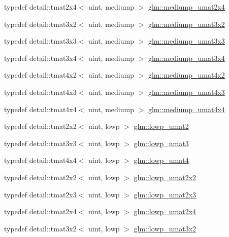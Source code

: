 \begin{CompactItemize}
\item 
typedef detail::tmat2x4$<$ uint, mediump $>$ \hyperlink{group__gtc__matrix__integer_gf79e9c80f024d31f3d66ddae75e90b6c}{glm::mediump\_\-umat2x4}
\item 
typedef detail::tmat3x2$<$ uint, mediump $>$ \hyperlink{group__gtc__matrix__integer_g65a9fdb1a5918fe6f308577065983e23}{glm::mediump\_\-umat3x2}
\item 
typedef detail::tmat3x3$<$ uint, mediump $>$ \hyperlink{group__gtc__matrix__integer_g31a05e7b2a6a596bdc7ceeb5d9c10e1c}{glm::mediump\_\-umat3x3}
\item 
typedef detail::tmat3x4$<$ uint, mediump $>$ \hyperlink{group__gtc__matrix__integer_g8113e067e1f327fac64cf9015c8c5431}{glm::mediump\_\-umat3x4}
\item 
typedef detail::tmat4x2$<$ uint, mediump $>$ \hyperlink{group__gtc__matrix__integer_g8ea45737e8bc9bfae2668968056b109f}{glm::mediump\_\-umat4x2}
\item 
typedef detail::tmat4x3$<$ uint, mediump $>$ \hyperlink{group__gtc__matrix__integer_gebe3b1b4b6030c096447e40fb00528f4}{glm::mediump\_\-umat4x3}
\item 
typedef detail::tmat4x4$<$ uint, mediump $>$ \hyperlink{group__gtc__matrix__integer_g24b1c76fefa58f810e24cafe0ea6a6a0}{glm::mediump\_\-umat4x4}
\item 
typedef detail::tmat2x2$<$ uint, lowp $>$ \hyperlink{group__gtc__matrix__integer_g09df85e6b5e53f66a86d042e0633bfbc}{glm::lowp\_\-umat2}
\item 
typedef detail::tmat3x3$<$ uint, lowp $>$ \hyperlink{group__gtc__matrix__integer_g7160c0ac500826224d3baf1003c0432c}{glm::lowp\_\-umat3}
\item 
typedef detail::tmat4x4$<$ uint, lowp $>$ \hyperlink{group__gtc__matrix__integer_g571dcc0328ddd1d8c54eba047b5bfa2f}{glm::lowp\_\-umat4}
\item 
typedef detail::tmat2x2$<$ uint, lowp $>$ \hyperlink{group__gtc__matrix__integer_ga4dfe67706187e459004b9a6c500b048}{glm::lowp\_\-umat2x2}
\item 
typedef detail::tmat2x3$<$ uint, lowp $>$ \hyperlink{group__gtc__matrix__integer_g4c8388c4a03f228c0e12dd7b7445115d}{glm::lowp\_\-umat2x3}
\item 
typedef detail::tmat2x4$<$ uint, lowp $>$ \hyperlink{group__gtc__matrix__integer_g581eef861234e918e88377fd331e37e6}{glm::lowp\_\-umat2x4}
\item 
typedef detail::tmat3x2$<$ uint, lowp $>$ \hyperlink{group__gtc__matrix__integer_g5874e964b1816f230215df28d22ea7de}{glm::lowp\_\-umat3x2}

\end{CompactItemize}
